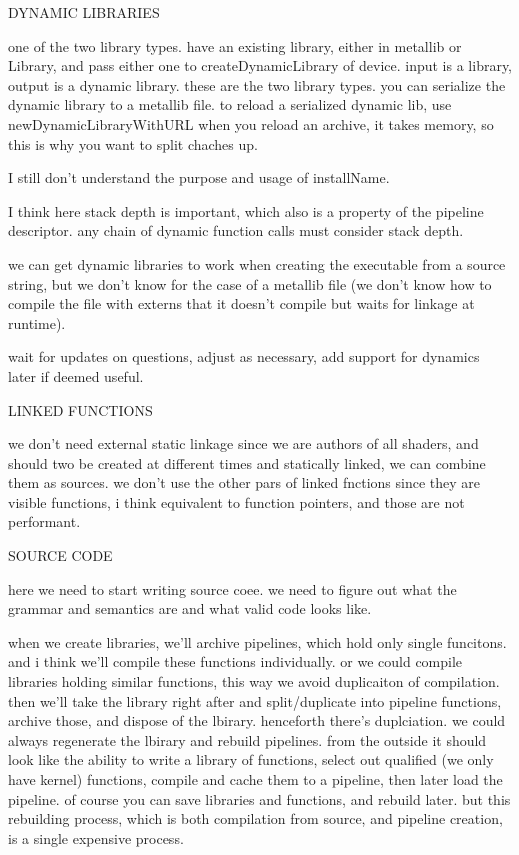 
DYNAMIC LIBRARIES

one of the two library types.
have an existing library, either in metallib or Library, and pass either one to createDynamicLibrary of device. input is a library, output is a dynamic library. these are the two library types. 
you can serialize the dynamic library to a metallib file.
to reload a serialized dynamic lib, use newDynamicLibraryWithURL
when you reload an archive, it takes memory, so this is why you want to split chaches up. 

I still don't understand the purpose and usage of installName.

I think here stack depth is important, which also is a property of the pipeline descriptor.
any chain of dynamic function calls must consider stack depth.

we can get dynamic libraries to work when creating the executable from a source string, but we don't know for the case of a metallib file (we don't know how to compile the file with externs that it doesn't compile but waits for linkage at runtime).

wait for updates on questions, adjust as necessary, add support for dynamics later if deemed useful.


LINKED FUNCTIONS

we don't need external static linkage since we are authors of all shaders, and should two be created at different times and statically linked, we can combine them as sources.
we don't use the other pars of linked fnctions since they are visible functions, i think equivalent to function pointers, and those are not performant. 


SOURCE CODE

here we need to start writing source coee. we need to figure out what the grammar and semantics are and what valid code looks like. 

when we create libraries, 
we'll archive pipelines, which hold only single funcitons. and i think we'll compile these functions individually. or we could compile libraries holding similar functions, this way we avoid duplicaiton of compilation. then we'll take the library right after and split/duplicate into pipeline functions, archive those, and dispose of the lbirary. henceforth there's duplciation. we could always regenerate the lbirary and rebuild pipelines.
from the outside it should look like the ability to write a library of functions, select out qualified (we only have kernel) functions, compile and cache them to a pipeline, then later load the pipeline. of course you can save libraries and functions, and rebuild later. but this rebuilding process, which is both compilation from source, and pipeline creation, is a single expensive process. 


